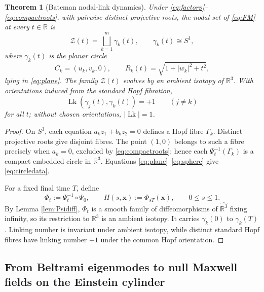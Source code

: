 \documentclass[aps,prd,reprint,nofootinbib,superscriptaddress]{revtex4-2}
\newtheorem{theorem}{Theorem}[section]
\theoremstyle{definition}
\theoremstyle{remark}
\newcommand{\R}{\mathbb{R}}
\newcommand{\cZ}{\mathcal{Z}}
\newcommand{\Lk}{\operatorname{Lk}}
\begin{document}
\begin{theorem}[Bateman nodal-link dynamics]
\label{thm:Bateman}
Under \eqref{eq:factorp}--\eqref{eq:compactroots}, with pairwise distinct projective roots, the nodal set of \eqref{eq:FM} at every $t\in\R$ is
\begin{equation}
\cZ(t)=\bigsqcup_{k=1}^m\gamma_k(t),
\qquad \gamma_k(t)\cong S^1,
\label{eq:nodalcircles}
\end{equation}
where $\gamma_k(t)$ is the planar circle
\begin{equation}
C_k=(u_k,v_k,0),
\qquad
R_k(t)=\sqrt{1+|w_k|^2+t^2},
\label{eq:circledata}
\end{equation}
lying in \eqref{eq:plane}. The family $\cZ(t)$ evolves by an ambient isotopy of $\R^3$. With orientations induced from the standard Hopf fibration,
\begin{equation}
\Lk(\gamma_j(t),\gamma_k(t))=+1
\qquad(j\ne k)
\label{eq:linking}
\end{equation}
for all $t$; without chosen orientations, $|\Lk|=1$.
\end{theorem}

\begin{proof}
On $S^3$, each equation $a_kz_1+b_kz_2=0$ defines a Hopf fibre $\Gamma_k$. Distinct projective roots give disjoint fibres. The point $(1,0)$ belongs to such a fibre precisely when $a_k=0$, excluded by \eqref{eq:compactroots}; hence each $\Psi_t^{-1}(\Gamma_k)$ is a compact embedded circle in $\R^3$. Equations \eqref{eq:plane}--\eqref{eq:sphere} give \eqref{eq:circledata}.

For a fixed final time $T$, define
\begin{equation}
\Phi_t:=\Psi_t^{-1}\circ\Psi_0,
\qquad
H(s,\mathbf x):=\Phi_{sT}(\mathbf x),
\qquad 0\le s\le1.
\label{eq:ambient}
\end{equation}
By Lemma \ref{lem:Psidiff}, $\Phi_t$ is a smooth family of diffeomorphisms of $\widehat{\R^3}$ fixing infinity, so its restriction to $\R^3$ is an ambient isotopy. It carries $\gamma_k(0)$ to $\gamma_k(T)$. Linking number is invariant under ambient isotopy, while distinct standard Hopf fibres have linking number $+1$ under the common Hopf orientation.
\end{proof}


\subsection{From Beltrami eigenmodes to null Maxwell fields on the Einstein cylinder}
\label{subsec:beltramiMaxwell}
\end{document}
